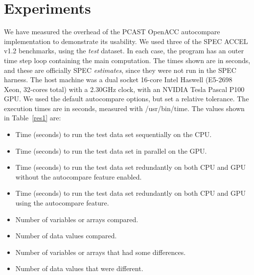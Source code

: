 \section{Experiments}

We have measured the overhead of the PCAST OpenACC autocompare implementation to demonstrate its usability.
We used three of the SPEC ACCEL v1.2 benchmarks, using the \emph{test} dataset.
In each case, the program has an outer time step loop containing the main computation.
The times shown are in seconds, and these are officially SPEC \emph{estimates}, since they were not run in the SPEC harness.
The host machine was a dual socket 16-core Intel Haswell (E5-2698 Xeon, 32-cores total) with a 2.30GHz clock, with an NVIDIA Tesla Pascal P100 GPU.
We used the default autocompare options, but set a relative tolerance.
The execution times are in seconds, measured with /usr/bin/time.
The values shown in Table~\ref{res1} are:
\begin{itemize}
\item Time (seconds) to run the test data set sequentially on the CPU.
\item Time (seconds) to run the test data set in parallel on the GPU.
\item Time (seconds) to run the test data set redundantly on both CPU and GPU without the autocompare feature enabled.
\item Time (seconds) to run the test data set redundantly on both CPU and GPU using the autocompare feature.
\item Number of variables or arrays compared.
\item Number of data values compared.
\item Number of variables or arrays that had some differences.
\item Number of data values that were different.
\end{itemize}


